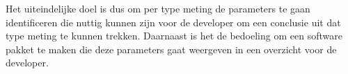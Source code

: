 Het uiteindelijke doel is dus om per type meting de parameters te gaan identificeren die nuttig kunnen zijn voor de developer om een conclusie uit dat type meting te kunnen trekken. Daarnaast is het de bedoeling om een software pakket te maken die deze parameters gaat weergeven in een overzicht voor de developer.

